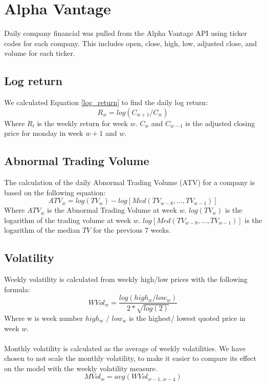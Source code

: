 \section{Alpha Vantage}
Daily company financial was pulled from the Alpha Vantage API using ticker codes for each company. This includes open, close, high, low, adjusted close, and volume for each ticker. 
\subsection{Log return}
We calculated Equation \eqref{log_return} to find the daily log return:
\begin{equation}
   \label{log_return} 
   R_w = log (C_{w+1}/C_{w}) 
\end{equation}
Where $R_t$ is the weekly return for week $w$. $C_w$ and  $C_{w-1}$ is the adjusted closing price for monday in week $w+1$ and $w$. 

\subsection{Abnormal Trading Volume}
The calculation of the daily Abnormal Trading Volume (ATV) for a company is based on the following equation: 
\begin{equation}
   \label{abnormal_volume} 
   ATV_{w} = log(TV_{w}) - log[Med(TV_{w-8},...,TV_{w-1})] 
\end{equation}
   Where $ATV_w$ is the Abnormal Trading Volume at week $w$. $log(TV_{w})$ is the logarithm of the trading volume at week $w$. $log[Med(TV_{w-8},...,TV_{w-1})]$ is the logarithm of the median $TV$ for the previous 7 weeks.


\subsection{Volatility}
Weekly volatility is calculated from weekly high/low prices with the following formula:
\begin{equation}
   \label{w_volatility} 
   WVol_{w} = \frac{log(high_w/low_w)}{2*\sqrt{log(2)}} 
\end{equation}
Where w is week number $high_w$ / $low_w$ is the highest/ lowest quoted price in week $w$.
\\\\
Monthly volatility is calculated as the average of weekly volatilities. We have chosen to not scale the monthly volatility, to make it easier to compare its effect on the model with the weekly volatility measure.
\begin{equation}
   \label{m_volatility} 
   MVol_{w} = avg( WVol_{w-1..w-4}) 
\end{equation}
